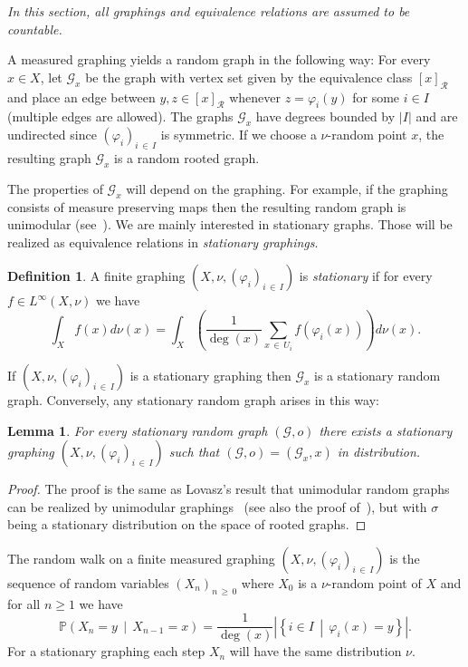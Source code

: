 \documentclass[10pt]{amsart}
\newtheorem{lemm}[theo]{Lemma}\newtheorem{prop}[theo]{Proposition}\newtheorem{coro}[theo]{Corollary}\newtheorem{conj}[theo]{Conjecture}
\theoremstyle{definition}\newtheorem{defi}[theo]{Definition}\newtheorem{rema}[theo]{Remark}\newtheorem{exam}[theo]{Example}\newtheorem{exem}[theo]{Example}\newtheorem{nota}[theo]{Notation}
\newcommand{\bbP}{\mathbb{P}}
\newcommand{\calR}{\mathcal{R}}
\newcommand{\calG}{\mathcal{G}}
\begin{document}
\emph{In this section, all graphings and equivalence relations are assumed to be countable.}

A measured graphing yields a random graph in the following way: For every $x\in X$, let $\calG_x$ be the graph with vertex set given by the equivalence class $[x]_{\calR}$ and place an edge between $y,z\in [x]_{\calR}$ whenever $z=\varphi_i(y)$ for some $i\in I$ (multiple edges are allowed). The graphs $\calG_x$ have degrees bounded by $|I|$ and are undirected since $(\varphi_i)_{i\,\in\,I}$ is symmetric. If we choose a $\nu$-random point $x$, the resulting graph $\calG_x$ is a random rooted graph.

The properties of $\calG_x$ will depend on the graphing. For example, if the graphing consists of measure preserving maps then the resulting random graph is unimodular (see~\cite{ALR2007}). We are mainly interested in stationary graphs. Those will be realized as equivalence relations in \emph{stationary graphings}.
\begin{defi}
A finite graphing $(X, \nu, (\varphi_i)_{i\,\in \,I})$ is \emph{stationary} if for every $f\in L^\infty(X,\nu)$ we have
\[
\int_X f(x)d\nu(x)=\int_X \left(\frac{1}{\deg(x)}\sum_{x\,\in\,U_i}f(\varphi_i(x))\right)d\nu(x).
\]
\end{defi}

If $(X, \nu, (\varphi_i)_{i\,\in\,I})$ is a stationary graphing then $\calG_x$ is a stationary random graph. Conversely, any stationary random graph arises in this way:

\begin{lemm}\label{lem:BernoulliGraphing}
For every stationary random graph $(\calG,o)$ there exists a stationary graphing $(X,\nu,(\varphi_i)_{i\,\in\,I})$ such that $(\calG,o)=(\calG_x,x)$ in distribution.
\end{lemm}

\begin{proof}
The proof is the same as Lovasz's result that unimodular random graphs can be realized by unimodular graphings~\cite[Theorem~18.37]{Lovasz} (see also the proof of~\cite[Proposition~14]{AGV14}), but with $\sigma$ being a stationary distribution on the space of rooted graphs.
\end{proof}

The random walk on a finite measured graphing $(X,\nu, (\varphi_i)_{i\,\in\,I})$ is the sequence of random variables $(X_n)_{n\,\geq\,0}$ where $X_0$ is a $\nu$-random point of $X$ and for all $n\geq 1$ we have
\[
\bbP\left(X_n=y \,\middle|\, X_{n-1}=x\right)=\frac{1}{\deg(x)}\left|\left\{i\in I \,\middle|\, \varphi_i(x)=y\right\}\right|.
\]
For a stationary graphing each step $X_n$ will have the same distribution $\nu$.
\end{document}
